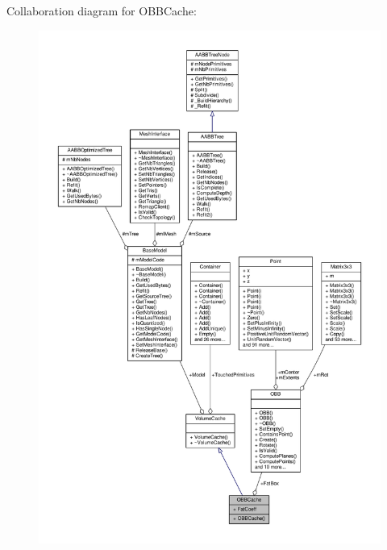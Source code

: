 Collaboration diagram for O\+B\+B\+Cache\+:
\nopagebreak
\begin{figure}[H]
\begin{center}
\leavevmode
\includegraphics[width=350pt]{d2/df7/structOBBCache__coll__graph}
\end{center}
\end{figure}
